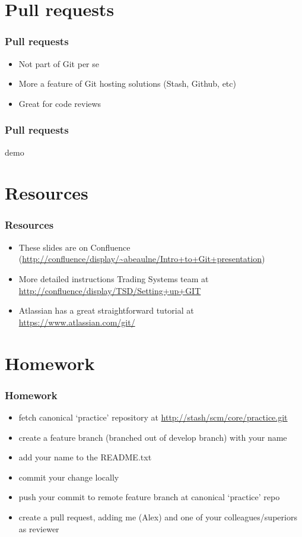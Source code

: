 \documentclass{beamer}
\begin{document}
\section{Pull requests}

\begin{frame}
    \frametitle{Pull requests}
    \begin{itemize}
        \item Not part of Git per se
        \item More a feature of Git hosting solutions (Stash, Github, etc)
        \item Great for code reviews
    \end{itemize}
\end{frame}

\begin{frame}
    \frametitle{Pull requests}
    demo
\end{frame}

\section{Resources}

\begin{frame}
    \frametitle{Resources}
    \begin{itemize}
        \item These slides are on Confluence (\url{http://confluence/display/~abeaulne/Intro+to+Git+presentation})
        \item More detailed instructions Trading Systems team at \url{http://confluence/display/TSD/Setting+up+GIT}
        \item Atlassian has a great straightforward tutorial at \url{https://www.atlassian.com/git/}
    \end{itemize}
\end{frame}

\section{Homework}

\begin{frame}
    \frametitle{Homework}
    \begin{itemize}
        \item fetch canonical `practice' repository at \url{http://stash/scm/core/practice.git}
        \item create a feature branch (branched out of develop branch) with your name
        \item add your name to the README.txt
        \item commit your change locally
        \item push your commit to remote feature branch at canonical `practice' repo
        \item create a pull request, adding me (Alex) and one of your colleagues/superiors as reviewer
    \end{itemize}
\end{frame}
\end{document}

